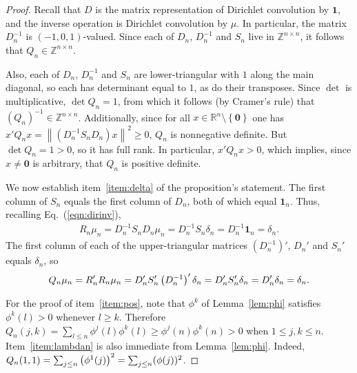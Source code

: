 \documentclass[12pt,reqno]{article}
\newcommand{\paren}[1]{\left\lparen{#1}\right\rparen}
\newcommand{\R}{\ensuremath{\mathbb{R}}}
\newcommand{\Z}{\ensuremath{\mathbb{Z}}}
\newcommand{\vv}[1]{\ensuremath{\mathbf{#1}}}
\newcommand{\norm}[1]{\ensuremath{\left\|{#1}\right\|}}
\newcommand{\set}[1]{\ensuremath{\left\{{#1}\right\}}}
\begin{document}
\begin{proof}
Recall that $D$ is the matrix representation of Dirichlet convolution by $\vv{1}$, and the inverse operation is Dirichlet convolution by $\mu$.
In particular, the matrix $D_n^{-1}$ is $(-1,0,1)$-valued.
Since each of $D_n$, $D_n^{-1}$ and $S_n$ live in $\Z^{n\times n}$, it follows that $Q_n\in\Z^{n\times n}$. 

Also, each of $D_n$, $D_n^{-1}$ and $S_n$ are lower-triangular with $1$ along the main diagonal, so each has determinant equal to $1$, as
do their transposes. Since
$\det$ is multiplicative, $\det Q_n=1$, from which it follows (by Cramer's rule) that $(Q_n)^{-1}\in\Z^{n\times n}$. Additionally, since for all $x\in\R^{n}\setminus\set{\vv{0}}$ one has $x'Q_nx = \norm{(D_n^{-1}S_nD_n) x}^2\geq 0$,
$Q_n$ is nonnegative definite. But $\det Q_n=1>0$, so it has full rank. In particular, $x'Q_nx >0$, which implies, since $x\neq \vv{0}$ is arbitrary, that $Q_n$ is positive definite.

We now establish item~\ref{item:delta} of the proposition's statement.
The first column of $S_n$ equals the first column of $D_n$, both of which equal $\vv{1}_n$. Thus, recalling Eq.~(\ref{eqn:dirinv}),
\begin{align*}
R_{n}\mu_n = D_n^{-1}S_nD_n\mu_n = D_n^{-1}S_n\delta_n = D_n^{-1}\vv{1}_n=\delta_n.
\end{align*}
The first column of each of the upper-triangular matrices $(D_n^{-1})'$, $D_n'$ and $S_n'$ equals $\delta_n$, so
\begin{align*}
Q_n\mu_n = R_n'R_n\mu_n = D_n'S_n'\paren{D_n^{-1}}'\delta_n = D_n'S_n'\delta_n = D_n'\delta_n  =\delta_n.
\end{align*}

For the proof of item~\ref{item:pos}, note that $\phi^k$ of Lemma~\ref{lem:phi} satisfies $\phi^{k}(l)>0$ whenever $l\geq k$. 
Therefore $Q_{n}(j,k)=\sum_{l\leq n} \phi^{j}(l)\phi^k(l)\geq \phi^{j}(n)\phi^{k}(n)>0$ when $1\leq j,k\leq n$.
Item~\ref{item:lambdan} is also immediate from Lemma~\ref{lem:phi}. Indeed, $Q_{n}(1,1)=\sum_{j\leq n} \paren{\phi^1(j)}^{2}=\sum_{j\leq n}(\phi(j))^{2}$.
\end{proof}
\end{document}
